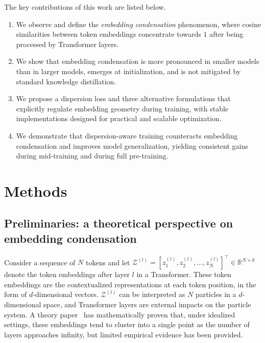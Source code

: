 \documentclass{article}
\theoremstyle{plain}
\theoremstyle{definition}
\theoremstyle{remark}
\begin{document}
The key contributions of this work are listed below.
\begin{enumerate}[topsep=4pt, itemsep=6pt, parsep=0pt]
    \item We observe and define the \textit{embedding condensation} phenomenon, where cosine similarities between token embeddings concentrate towards $1$ after being processed by Transformer layers.
    
    \item We show that embedding condensation is more pronounced in smaller models than in larger models, emerges at initialization, and is not mitigated by standard knowledge distillation.

    \item We propose a dispersion loss and three alternative formulations that explicitly regulate embedding geometry during training, with stable implementations designed for practical and scalable optimization.

    \item We demonstrate that dispersion-aware training counteracts embedding condensation and improves model generalization, yielding consistent gains during mid-training and during full pre-training.
\end{enumerate}


\section{Methods}
\subsection{Preliminaries: a theoretical perspective on embedding condensation}
Consider a sequence of $N$ tokens and let $\mathcal{Z}^{(l)} = [z_1^{(l)}, z_2^{(l)}, \ldots, z_N^{(l)}]^\top \in \mathbb{R}^{N \times d}$ denote the token embeddings after layer $l$ in a Transformer. These token embeddings are the contextualized representations at each token position, in the form of $d$-dimensional vectors. $\mathcal{Z}^{(l)}$ can be interpreted as $N$ particles in a $d$-dimensional space, and Transformer layers are external impacts on the particle system. A theory paper~\cite{Math_Transformer} has mathematically proven that, under idealized settings, these embeddings tend to cluster into a single point as the number of layers approaches infinity, but limited empirical evidence has been provided.
\end{document}
